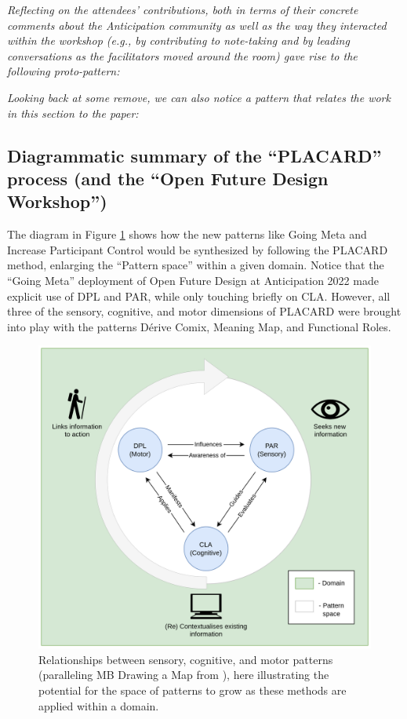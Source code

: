 \documentclass[acmlarge,timestamp]{acmart}
\DeclareRobustCommand{\scitshape}{\fontshape{\scitdefault}\selectfont}
\begin{document}


\medskip

\noindent \emph{Reflecting on the attendees’ contributions, both in
terms of their concrete comments about the Anticipation community as
well as the way they interacted within the workshop (e.g., by
contributing to note-taking and by leading conversations as the
facilitators moved around the room) gave rise to the following
proto-pattern:}



\medskip

\noindent \emph{Looking back at some remove, we can also notice a
pattern that relates the work in this section to the paper:}



\subsection{Diagrammatic summary of the “PLACARD” process (and the “Open Future Design Workshop”)}\label{illustrative_diagram}
The diagram in Figure \ref{alex-diagram} shows how the new patterns
like {\sc Going Meta} and {\sc Increase Participant Control} would be
synthesized by following the PLACARD method, enlarging the “Pattern
space” within a given domain.  Notice that the “Going Meta” deployment
of Open Future Design at Anticipation 2022 made explicit use of DPL
and PAR, while only touching briefly on CLA.  However, all three of
the sensory, cognitive, and motor dimensions of PLACARD were brought
into play with the patterns {\sc Dérive Comix}, {\sc Meaning Map}, and
{\sc Functional Roles}.

\begin{figure}[h!]
\includegraphics[width=.8\textwidth]{alex-image-updated.png}
  \caption{Relationships between sensory, cognitive, and motor patterns (paralleling {\scitshape MB Drawing a Map} from \citet{iba2016pattern}), here illustrating the potential for the space of patterns to grow as these methods are applied within a domain.\label{alex-diagram}}
\end{figure}
\end{document}
